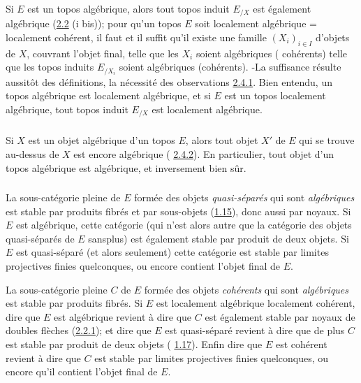 \documentclass[10pt]{../fichiers-configuration-latex/smfart}
\begin{document}
\subsubsection{}
Si $E$ est un topos algébrique, alors tout topos induit $E_{/X}$ est
également algébrique (\hyperref[VI.prop2.2]{2.2} (i bis)); pour qu'un topos $E$ soit
localement algébrique = localement cohérent, il faut et il suffit
qu'il existe une famille $(X_i)_{i \in I}$ d'objets de $X$, couvrant
l'objet final, telle que les $X_i$ soient algébriques (\resp
cohérents) \ie telle que les topos induits $E_{/X_{i}}$ soient algébriques
(\resp cohérents). -La suffisance résulte aussitôt des définitions, la
nécessité des observations \hyperref[VI.subsubsec2.4.1]{2.4.1}. Bien entendu, un topos algébrique
est localement algébrique, et si $E$ est un topos localement
algébrique, tout topos induit $E_{/X}$ est localement algébrique.

\subsubsection{}
Si $X$ est un objet algébrique d'un topos $E$, alors tout objet $X'$
de $E$ qui se trouve au-dessus de $X$ est encore algébrique (\cf
\hyperref[VI.subsubsec2.4.2]{2.4.2}). En particulier, tout objet d'un topos algébrique est
algébrique, et inversement bien sûr.

\subsubsection{}
La sous-catégorie pleine de $E$ formée des objets
\emph{quasi-séparés} qui sont \emph{algébriques} est stable par
produits fibrés et par sous-objets (\hyperref[VI.cor1.15]{1.15}), donc aussi
par noyaux. Si $E$ est algébrique, cette catégorie (qui n'est alors
autre que la catégorie des objets quasi-séparés de $E$
sans\pageoriginale plus) est également stable par produit de deux
objets. Si $E$ est quasi-séparé (et alors seulement) cette catégorie
est stable par limites projectives finies quelconques, ou encore
contient l'objet final de $E$.

La sous-catégorie pleine $C$ de $E$ formée des objets \emph{cohérents}
qui sont \emph{algébriques} est stable par produits fibrés. Si $E$ est
localement algébrique \ie localement cohérent, dire que $E$ est
algébrique revient à dire que $C$ est également stable par noyaux de
doubles flèches (\hyperref[VI.rem2.2.1]{2.2.1}); et dire que $E$ est quasi-séparé revient à
dire que de plus $C$ est stable par produit de deux objets (\cf
\hyperref[VI.cor1.17]{1.17}). Enfin dire que $E$ est cohérent revient à dire que $C$ est
stable par limites projectives finies quelconques, ou encore qu'il
contient l'objet final de $E$.
\end{document}
